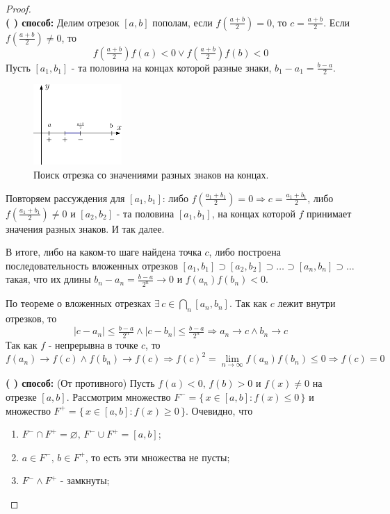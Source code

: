 \documentclass[12pt]{article}
\newcommand{\RN}[1]{%
	\textup{\uppercase\expandafter{\romannumeral#1}}%
}
\theoremstyle{definition}
\begin{document}
\begin{proof}\hfill\\
	\textbf{(\RN{1}) способ:} Делим отрезок $[a,b]$ пополам, если $f(\frac{a+b}{2}) = 0$, то $c = \frac{a+b}{2}$. Если $f(\frac{a+b}{2}) \neq 0$, то 
	$$f(\tfrac{a+b}{2})f(a) < 0 \vee f(\tfrac{a+b}{2})f(b) < 0$$ Пусть $[a_1,b_1]$ - та половина на концах которой разные знаки, $b_1 - a_1 = \frac{b-a}{2}$.

	\begin{figure}[H]
		\centering
		\includegraphics[width=0.3\textwidth]{18_6.eps}
		\caption{Поиск отрезка со значениями разных знаков на концах.}
		\label{18_6}
	\end{figure}
	
	Повторяем рассуждения для $[a_1, b_1]$: либо $f(\frac{a_1+b_1}{2}) = 0 \Rightarrow c = \frac{a_1+b_1}{2}$, либо $f(\frac{a_1+b_1}{2}) \neq 0$ и $[a_2, b_2]$ - та половина $[a_1,b_1]$, на концах которой $f$ принимает значения разных знаков. И так далее.
	
	В итоге, либо на каком-то шаге найдена точка $c$, либо построена последовательность вложенных отрезков $[a_1,b_1] \supset [a_2,b_2] \supset \dotsc \supset [a_n, b_n] \supset \dotsc$ такая, что их длины $b_n - a_n = \frac{b-a}{2^n} \to 0$ и $f(a_n) f(b_n) <0$. 
	
	По теореме о вложенных отрезках $\exists \, c \in \bigcap\limits_n [a_n, b_n]$. Так как $c$ лежит внутри отрезков, то $$|c - a_n| \leq \tfrac{b-a}{2^n} \wedge |c - b_n| \leq \tfrac{b-a}{2^n} \Rightarrow a_n \to c \wedge b_n \to c$$ 
	Так как $f$ - непрерывна в точке $c$, то 
	$$f(a_n) \to f(c) \wedge f(b_n) \to f(c) \Rightarrow f(c)^2 = \lim\limits_{n\to \infty} f(a_n)f(b_n) \leq 0 \Rightarrow f(c) = 0$$
	
	\textbf{(\RN{2}) способ:} (От противного) Пусть $f(a) < 0, \, f(b) > 0$ и $f(x) \neq 0$ на отрезке $[a,b]$. Рассмотрим множество $F^- = \{\,x \in [a,b] \colon f(x) \leq 0 \,\}$ и множество $F^+ = \{\,x \in [a,b] \colon f(x) \geq 0 \,\}$. 
	Очевидно, что 
	\begin{enumerate}[label={\arabic*)}]
		\item $F^- \cap F^+ = \varnothing, \, F^- \cup F^+ = [a,b]$;
		\item $a \in F^-, \, b \in F^+$, то есть эти множества не пусты;
		\item $F^- \wedge F^+$ - замкнуты;
	\end{enumerate}


\end{proof}
\end{document}
